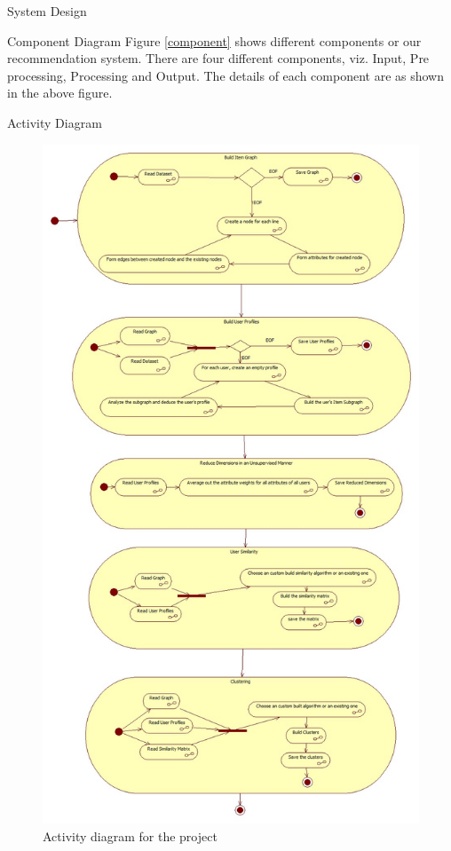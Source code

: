 \documentclass{report}
\begin{document}
\begin{projChapter}{System Design}
\begin{projSection}{Component Diagram}
Figure \ref{component} shows different components or our recommendation system. There are four different components, viz. Input, Pre processing, Processing and Output. The details of each component are as shown in the above figure.
        \end{projSection}
\begin{projSection}{Activity Diagram}
\begin{figure}[ht!]
\centering
\includegraphics[scale=0.3]{images/activity.png}
\caption{Activity diagram for the project}
\label{activity}
\end{figure}


\end{projSection}
\end{projChapter}
\end{document}
